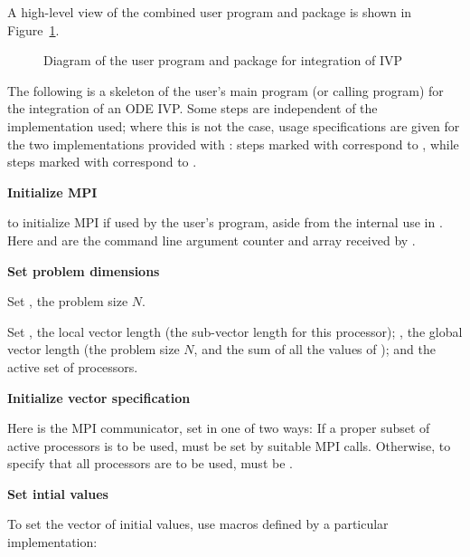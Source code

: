 A high-level view of the combined user program and {\cvodes} package is
shown in Figure~\ref{f:sim_overview}.
\begin{figure}
\centerline{}
\caption {Diagram of the user program and 
  {\cvodes} package for integration of IVP}\label{f:sim_overview}
\end{figure}
The following is a skeleton of the user's main program (or calling
program) for the integration of an ODE IVP. Some steps are independent of the {\nvector}
implementation used; where this is not the case, usage specifications are given for the
two implementations provided with {\cvodes}: steps marked with {\p} correspond to 
{\nvecp}, while steps marked with {\s} correspond to {\nvecs}.
\begin{Steps}
  
\item 
  {\bf {\p} Initialize MPI}

   to initialize MPI if used by
  the user's program, aside from the internal use in {\nvecp}.  
  Here  and  are the command line argument 
  counter and array received by .
  
\item
  {\bf Set problem dimensions}

  {\s} Set , the problem size $N$.

  {\p} Set , the local vector length (the sub-vector
  length for this processor); , the global vector length (the
  problem size $N$, and the sum of all the values of );
  and the active set of processors.
  
\item\label{i:nv_spec_init}
  {\bf Initialize vector specification}

  {\s} 

  {\p} 
  Here  is the MPI communicator, set in one of two ways: 
  If a proper subset of active processors is to be used,  
  must be set by suitable MPI calls. Otherwise, to specify that all 
  processors are to be used,  must be .
  
\item
  {\bf Set intial values}
 
  To set the vector  of initial values, use macros defined by a particular 
  {\nvector} implementation:


\end{Steps}
